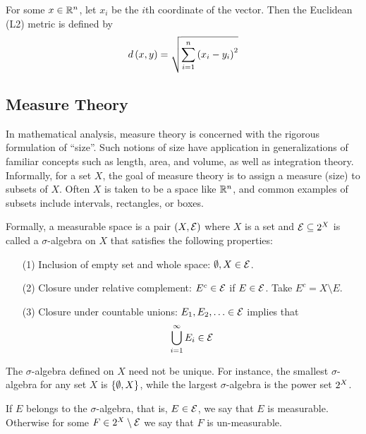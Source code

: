 \begin{example}
  For some \(x \in \mathbb{R}^n\),
  let \(x_i\) be the \(i\)th coordinate of the vector.
  Then the Euclidean (L2) metric is defined by
  \begin{align*}
    d\left(x, y\right)
      = \sqrt{\sum_{i = 1}^{n} \left(x_i - y_i\right)^2}
  \end{align*}
\end{example}


\subsection{Measure Theory}

In mathematical analysis, measure theory is concerned with
the rigorous formulation of ``size''.
Such notions of size have application in generalizations of
familiar concepts such as length, area, and volume,
as well as integration theory.
Informally, for a set \(X\),
the goal of measure theory is to assign a measure (size) to subsets of \(X\).
Often \(X\) is taken to be a space like \(\mathbb{R}^n\),
and common examples of subsets include intervals, rectangles, or boxes.


Formally, a measurable space is a pair
\(\left(X, \mathcal{E}\right)\) where
\(X\) is a set and \(\mathcal{E} \subseteq 2^{X}\) is called
a \(\sigma\)-algebra on \(X\) that satisfies the following properties:
\begin{enumerate}
  \item[(1)]
    Inclusion of empty set and whole space: \(\emptyset, X \in \mathcal{E}\).

  \item[(2)]
    Closure under relative complement:
    \(E^c \in \mathcal{E}\) if \(E \in \mathcal{E}\).
    Take \(E^c = X \setminus E\).

  \item[(3)]
    Closure under countable unions:
    \(E_1, E_2, \ldots \in \mathcal{E}\) implies that
    \begin{align*}
      \bigcup_{i = 1}^{\infty} E_i \in \mathcal{E}
    \end{align*}

\end{enumerate}

The \(\sigma\)-algebra defined on \(X\) need not be unique.
For instance, the smallest \(\sigma\)-algebra for any set \(X\)
is \(\left\{\emptyset, X\right\}\),
while the largest \(\sigma\)-algebra is the power set \(2^{X}\).

If \(E\) belongs to the \(\sigma\)-algebra,
that is, \(E \in \mathcal{E}\), we say that \(E\) is measurable.
Otherwise for some \(F \in 2^{X} \setminus \mathcal{E}\)
we say that \(F\) is un-measurable.

